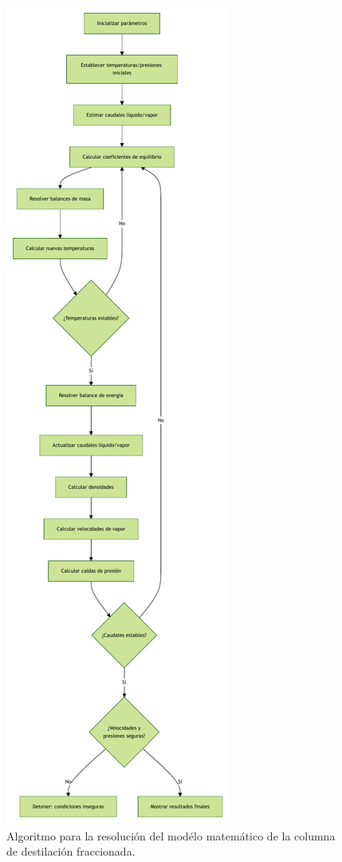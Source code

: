 \newpage
\begin{figure}[ht]
      \centering
      \includegraphics[height=0.85\textheight]{../resources/flowcharts/algoritmo_mesh.pdf}
      \caption{Algoritmo para la resolución del modélo matemático de la columna de destilación fraccionada.}
\end{figure}
